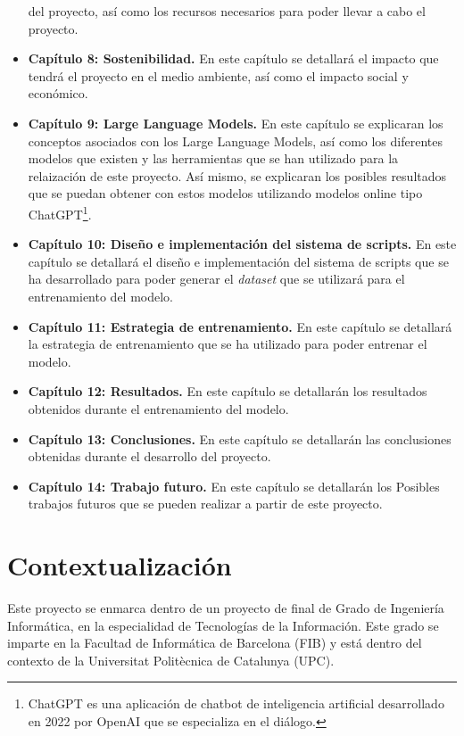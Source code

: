 \begin{itemize}
        del proyecto, así como los recursos necesarios para poder llevar a cabo el proyecto.
    \item \textbf{Capítulo 8: Sostenibilidad.} En este capítulo se detallará el impacto
        que tendrá el proyecto en el medio ambiente, así como el impacto social y económico.
    \item \textbf{Capítulo 9: Large Language Models.} En este capítulo se explicaran los
        conceptos asociados con los Large Language Models, así como los diferentes modelos
        que existen y las herramientas que se han utilizado para la relaización de este
        proyecto. Así mismo, se explicaran los posibles resultados que se puedan obtener con
        estos modelos utilizando modelos online tipo ChatGPT\footnote{ChatGPT es una aplicación
        de chatbot de inteligencia artificial desarrollado en 2022 por OpenAI que se especializa
        en el diálogo.}.
    \item \textbf{Capítulo 10: Diseño e implementación del sistema de scripts.} En este
        capítulo se detallará el diseño e implementación del sistema de scripts que se
        ha desarrollado para poder generar el \textit{dataset} que se utilizará para el
        entrenamiento del modelo.
    \item \textbf{Capítulo 11: Estrategia de entrenamiento.} En este capítulo se detallará
        la estrategia de entrenamiento que se ha utilizado para poder entrenar el modelo.
    \item \textbf{Capítulo 12: Resultados.} En este capítulo se detallarán los resultados
        obtenidos durante el entrenamiento del modelo.
    \item \textbf{Capítulo 13: Conclusiones.} En este capítulo se detallarán las conclusiones
        obtenidas durante el desarrollo del proyecto.
    \item \textbf{Capítulo 14: Trabajo futuro.} En este capítulo se detallarán los Posibles
        trabajos futuros que se pueden realizar a partir de este proyecto.
\end{itemize}

\section{Contextualización}
\label{sec:contextualizacion}


Este proyecto se enmarca dentro de un proyecto de final de Grado de Ingeniería
Informática, en la especialidad de Tecnologías de la Información. Este grado se
imparte en la Facultad de Informática de Barcelona (FIB) y está dentro del contexto
de la Universitat Politècnica de Catalunya (UPC).

